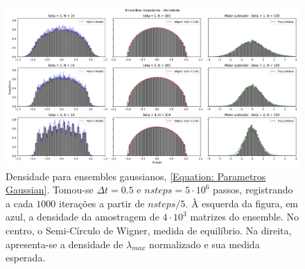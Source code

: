 \begin{figure}[ht!]
	\centering
	\includegraphics[width=\textwidth]{Assets/validationGaussianTracy.png}
	\caption{Densidade para ensembles gaussianos, \ref{Equation: Parametros Gaussian}. Tomou-se $\Delta t = 0.5$ e $nsteps = 5\cdot10^6$ passos, registrando a cada $1000$ iterações a partir de $nsteps/5$. À esquerda da figura, em azul, a densidade da amostragem de $4\cdot10^3$ matrizes do ensemble. No centro, o Semi-Círculo de Wigner, medida de equilíbrio. Na direita, apresenta-se a densidade de $\lambda_{max}$ normalizado e sua medida esperada.}
	\label{Figura: Gaussian}
\end{figure}

